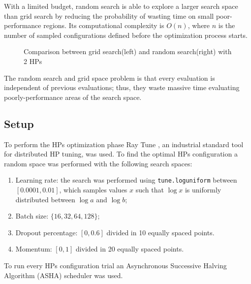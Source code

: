 With a limited budget, random search is able to explore a larger search space than grid search by reducing the 
probability of wasting time on small poor-performance regions. Its computational complexity is $O(n)$, where $n$ 
is the number of sampled configurations defined before the optimization process starts.

\begin{figure}[H]
    \centering
    \begin{minipage}{0.45\textwidth}
        \resizebox{\textwidth}{!}{}
    \end{minipage}
    \begin{minipage}{0.45\textwidth}
        \resizebox{\textwidth}{!}{}
    \end{minipage}
    \vspace{-0.5em}
    \captionsetup{width=0.94\linewidth}
    \caption{Comparison between grid search(left) and random search(right) with 2 HPs\label{fig:grisSearch}}
\end{figure}

The random search and grid space problem is that every evaluation is independent of previous evaluations; 
thus, they waste massive time evaluating poorly-performance areas of the search space.

\subsection{Setup}
To perform the HPs optimization phase Ray Tune \cite{liaw2018tune}, an industrial standard tool for distributed HP 
tuning, was used. To find the optimal HPs configuration a random space was performed with the following search
spaces:
\begin{enumerate}
    \item Learning rate: the search was performed using \texttt{tune.loguniform} between $[0.0001,0.01]$, which 
    samples values $x$ such that $\log{x}$ is uniformly distributed between $\log{a}$ and $\log{b}$;
    \item Batch size: $\{16,32,64,128\}$;
    \item Dropout percentage: $[0,0.6]$ divided in 10 equally spaced points.
    \item Momentum: $[0,1]$ divided in 20 equally spaced points.
\end{enumerate}

\noindent
To run every HPs configuration trial an Asynchronous Successive Halving Algorithm (ASHA) scheduler
\cite{li2020massivelyparallelhyperparametertuning} was used. 

